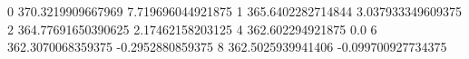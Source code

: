 0 370.3219909667969 7.719696044921875
1 365.6402282714844 3.037933349609375
2 364.77691650390625 2.17462158203125
4 362.602294921875 0.0
6 362.3070068359375 -0.2952880859375
8 362.5025939941406 -0.099700927734375
